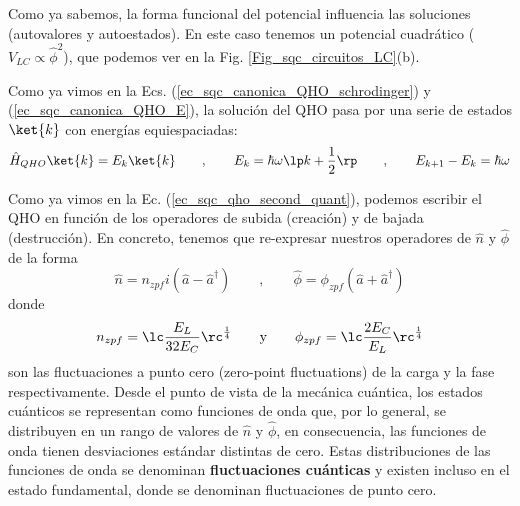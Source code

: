         Como ya sabemos, la forma funcional del potencial influencia las soluciones (autovalores y autoestados). En este caso tenemos un potencial cuadrático ($V_{LC} \propto \hat{\phi}^2$), que podemos ver en la Fig. \ref{Fig_sqc_circuitos_LC}(b). 
        
        Como ya vimos en la Ecs. (\ref{ec_sqc_canonica_QHO_schrodinger}) y (\ref{ec_sqc_canonica_QHO_E}), la solución del QHO pasa por una serie de estados $\ket{k}$ con energías equiespaciadas:
        \begin{equation}
            \hat{H}_{QHO} \ket{k} = E_k \ket{k} 
            \qquad , \qquad
            E_k = \hbar \omega \lp k + \frac{1}{2} \rp 
            \qquad , \qquad
            E_{k+1} - E_k = \hbar \omega
        \end{equation}


            


        
        

        Como ya vimos en la Ec. (\ref{ec_sqc_qho_second_quant}), podemos escribir el QHO en función de los operadores de subida (creación) y de bajada (destrucción). En concreto, tenemos que re-expresar nuestros operadores de $\hat{n}$ y $\hat{\phi}$ de la forma
        \begin{equation} \label{ec_scq_LC_cuantico_segunda_cuant_variables}
            \hat{n} = n_{zpf} i (\hat{a} - \hat{a}^\dagger) 
            \qquad , \qquad
            \hat{\phi} = \phi_{zpf} (\hat{a} + \hat{a}^\dagger)
        \end{equation}
        donde 
        \begin{equation}
            n_{zpf} = \lc \frac{E_L}{32 E_C} \rc^{\frac{1}{4}} 
            \qquad \text{y} \qquad
            \phi_{zpf} = \lc \frac{2E_C}{E_L} \rc^{\frac{1}{4}}
        \end{equation}
        son las fluctuaciones a punto cero (zero-point fluctuations) de la carga y la fase respectivamente. Desde el punto de vista de la mecánica cuántica, los estados cuánticos se representan como funciones de onda que, por lo general, se distribuyen en un rango de valores de $\hat{n}$ y $\hat{\phi}$, en consecuencia, las funciones de onda tienen desviaciones estándar distintas de cero. Estas distribuciones de las funciones de onda se denominan \textbf{fluctuaciones cuánticas} y existen incluso en el estado fundamental, donde se denominan fluctuaciones de punto cero.



